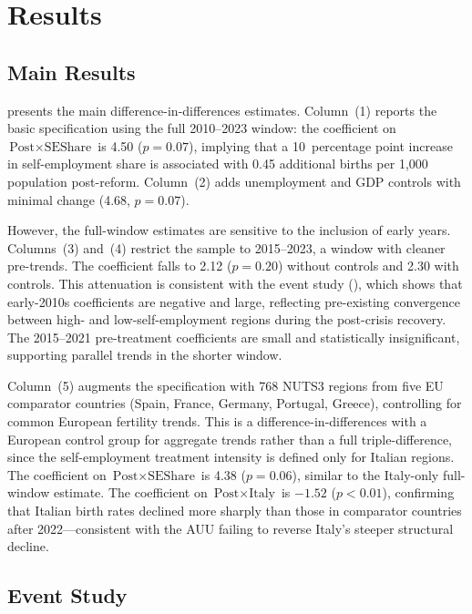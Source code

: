 \documentclass[12pt]{article}
\begin{document}
\section{Results}

\subsection{Main Results}

 presents the main difference-in-differences estimates. Column~(1) reports the basic specification using the full 2010--2023 window: the coefficient on $\text{Post} \times \text{SEShare}$ is 4.50 ($p = 0.07$), implying that a 10~percentage point increase in self-employment share is associated with 0.45 additional births per 1,000 population post-reform. Column~(2) adds unemployment and GDP controls with minimal change (4.68, $p = 0.07$).

However, the full-window estimates are sensitive to the inclusion of early years. Columns~(3) and~(4) restrict the sample to 2015--2023, a window with cleaner pre-trends. The coefficient falls to 2.12 ($p = 0.20$) without controls and 2.30 with controls. This attenuation is consistent with the event study (), which shows that early-2010s coefficients are negative and large, reflecting pre-existing convergence between high- and low-self-employment regions during the post-crisis recovery. The 2015--2021 pre-treatment coefficients are small and statistically insignificant, supporting parallel trends in the shorter window.

Column~(5) augments the specification with 768 NUTS3 regions from five EU comparator countries (Spain, France, Germany, Portugal, Greece), controlling for common European fertility trends. This is a difference-in-differences with a European control group for aggregate trends rather than a full triple-difference, since the self-employment treatment intensity is defined only for Italian regions. The coefficient on $\text{Post} \times \text{SEShare}$ is 4.38 ($p = 0.06$), similar to the Italy-only full-window estimate. The coefficient on $\text{Post} \times \text{Italy}$ is $-1.52$ ($p < 0.01$), confirming that Italian birth rates declined more sharply than those in comparator countries after 2022---consistent with the AUU failing to reverse Italy's steeper structural decline.



\subsection{Event Study}
\end{document}
